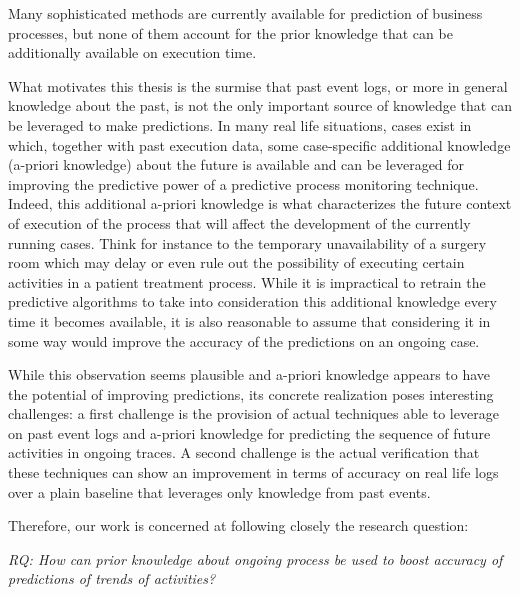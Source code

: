 Many sophisticated methods\cite{evermann,Polatoetal:2016,niek96732} are currently available for prediction of business processes, but none of them account for the prior knowledge that can be additionally available on execution time. 

What motivates this thesis is the surmise that past event logs, or more in general knowledge about the past, is not the only important source of knowledge that can be leveraged to make predictions. In many real life situations, cases exist in which, together with past execution data, some case-specific additional knowledge (a-priori knowledge) about the future is available and can be leveraged for improving the predictive power of a predictive process monitoring technique. Indeed, this additional a-priori knowledge is what characterizes the future context of execution of the process that will affect the development of the currently running cases. Think for instance to the temporary unavailability of a surgery room which may delay or even rule out the possibility of executing  certain activities in a patient treatment process. While it is impractical to retrain the predictive algorithms to take into consideration this additional knowledge every time it becomes available, it is also reasonable to assume that considering it in some way would improve the accuracy of the predictions on an ongoing case.

While this observation seems plausible and a-priori knowledge appears to have the potential of improving predictions, its concrete realization poses interesting challenges: a first challenge is the provision of actual techniques able to leverage on past event logs and a-priori knowledge for predicting the sequence of future activities in ongoing traces. A second challenge is the actual verification that these techniques can show an improvement in terms of accuracy on real life logs over a plain baseline that leverages only knowledge from past events.

Therefore, our work is concerned at following closely the research question:

\textit{RQ: How can prior knowledge about ongoing process be used to boost accuracy of predictions of trends of activities?}


